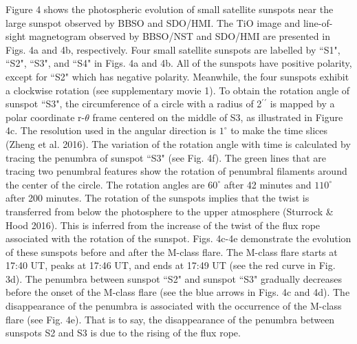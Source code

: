 \documentclass[12pt,preprint]{aastex}
\begin{document}
\begin{CJK*}{UTF8}{gbsn}
Figure 4 shows the photospheric evolution of small satellite sunspots near the large sunspot observed by BBSO and SDO/HMI. The TiO image and line-of-sight magnetogram observed by BBSO/NST and SDO/HMI are presented in Figs. 4a and 4b, respectively. Four small satellite sunspots are labelled by ``S1", ``S2", ``S3", and ``S4" in Figs. 4a and 4b. All of the sunspots have positive polarity, except for ``S2" which has negative polarity. Meanwhile, the four sunspots exhibit a clockwise rotation (see supplementary movie 1).  To obtain the rotation angle of sunspot ``S3", the circumference of a circle with a radius of 2$^\prime$$^\prime$ is mapped by a polar coordinate r-$\theta$ frame centered on the middle of S3, as illustrated in Figure 4c. The resolution used in the angular direction is $1^{\circ}$ to make the time slices (Zheng et al. 2016). The variation of the rotation angle with time is calculated by tracing the penumbra of sunspot ``S3" (see Fig. 4f). The green lines that are tracing two penumbral features show the rotation of penumbral filaments around the center of the circle. The rotation angles are $60^{\circ}$ after 42 minutes and $110^{\circ}$ after 200 minutes. The rotation of the sunspots implies that the twist is transferred from below the photosphere to the upper atmosphere (Sturrock \& Hood 2016). This is inferred from the increase of the twist of the flux rope associated with the rotation of the sunspot. Figs. 4c-4e demonstrate the evolution of these sunspots before and after the M-class flare. The M-class flare starts at 17:40 UT, peaks at 17:46 UT, and ends at 17:49 UT (see the red curve in Fig. 3d).  The penumbra between sunspot ``S2" and sunspot ``S3" gradually decreases before the onset of the M-class flare (see the blue arrows in Figs. 4c and 4d). The disappearance of the penumbra is associated with the occurrence of the M-class flare (see Fig. 4e). That is to say, the disappearance of the penumbra between sunspots S2 and S3 is due to the rising of the flux rope. 


\end{CJK*}
\end{document}
